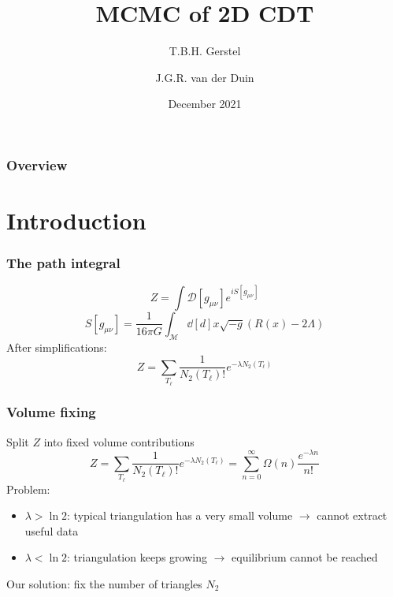 \documentclass{beamer}
\title{MCMC of 2D CDT}
\author{T.B.H. Gerstel \and J.G.R. van der Duin}
\date{December 2021}
\institute{Radboud University Nijmegen}
\begin{document}
\frame{\titlepage}

\begin{frame}
    \frametitle{Overview}
    \tableofcontents
\end{frame}

\section{Introduction}
\begin{frame}
    \frametitle{The path integral}
    \begin{equation}
        Z = \int \mathcal{D}[g_{\mu \nu}] e^{i S[g_{\mu \nu}]}
    \end{equation}
    \begin{equation}
        S[g_{\mu \nu}]
        =
        \frac{1}{16 \pi G}
        \int_\mathcal{M} \dd[d]{x} \sqrt{-g}
        (R(x) - 2 \Lambda)
    \end{equation}
    After simplifications: %
    \begin{equation}
        Z = \sum_{T_\ell} \frac{1}{N_2(T_\ell)!} e^{-\lambda N_2(T_\ell)}
    \end{equation}
\end{frame}

\begin{frame}
    \frametitle{Volume fixing}
    Split $Z$ into fixed volume contributions
    \begin{equation}
        Z
        =
        \sum_{T_\ell} \frac{1}{N_2(T_\ell)!} e^{-\lambda N_2(T_\ell)}
        =
        \sum_{n = 0}^\infty \Omega(n) \frac{e^{-\lambda n}}{n!}
    \end{equation}
    Problem:
    \begin{itemize}
        \item $\lambda > \ln 2$: typical triangulation has a very small volume $\to$ cannot extract useful data
        \item $\lambda < \ln 2$: triangulation keeps growing $\to$ equilibrium cannot be reached
    \end{itemize}
    Our solution: fix the number of triangles $N_2$
\end{frame}
\end{document}
